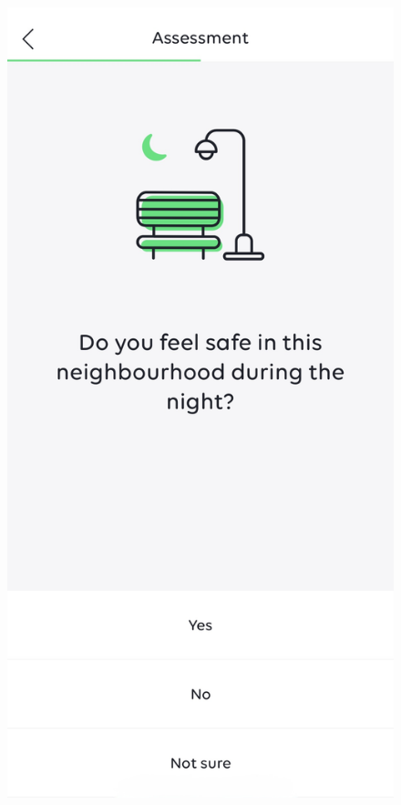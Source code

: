 \begin{figure}[h]
    \centering
    \begin{minipage}[t]{0.38\textwidth}
        \centering
        \includegraphics[width=\textwidth]{Arbeit/images/urban_mind01.jpeg}

\end{minipage}
\end{figure}

